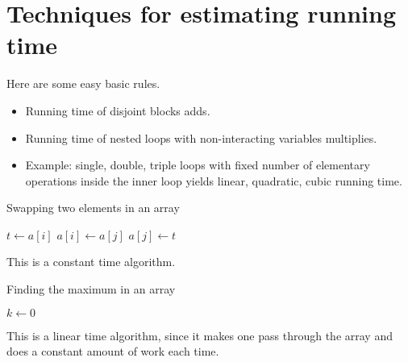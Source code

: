 \chapter{Techniques for estimating running time}

Here are some easy basic rules.
\begin{itemize}
\item Running time of disjoint blocks adds.
\item Running time of nested  loops with non-interacting variables multiplies.
\item Example: single, double, triple loops with fixed number of elementary operations inside the inner loop yields linear, quadratic, cubic running time.
\end{itemize}




\begin{Example}
\begin{algorithm}[H]
  \caption{Swapping two elements in an array
    \label{alg:swap}}
\begin{algorithmic}[0]
\State $t \gets a[i]$
\State $a[i] \gets a[j]$
\State $a[j] \gets t$
\State {}
\EndFunction
\end{algorithmic}
\end{algorithm}

This is a constant time algorithm.
\end{Example}


\begin{Example}
\begin{algorithm}[H]
  \caption{Finding the maximum in an array
    \label{alg:findmax}}
\begin{algorithmic}[0]
\State $k \gets 0$ 
\EndIf
\EndFor
\State {}
\EndFunction
\end{algorithmic}
\end{algorithm}

This is a linear time algorithm, since it makes one pass through the array and does a constant amount of work each time.
\end{Example}



